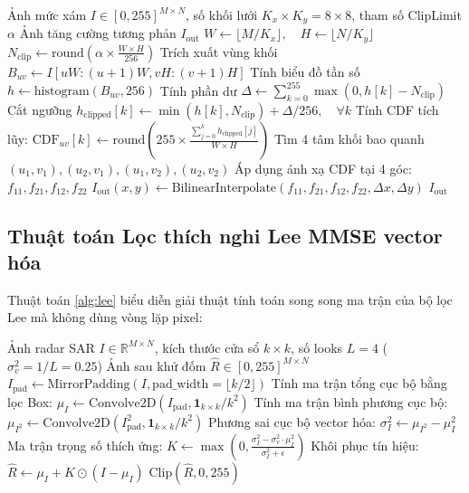 \begin{algorithm}[H]
\caption{Cân bằng Histogram thích nghi có ngưỡng (CLAHE)}
\label{alg:clahe}
\begin{algorithmic}[1]
\Require Ảnh mức xám $I \in [0, 255]^{M \times N}$, số khối lưới $K_x \times K_y = 8 \times 8$, tham số ClipLimit $\alpha$
\Ensure Ảnh tăng cường tương phản $I_{\text{out}}$
\State $W \gets \lfloor M / K_x \rfloor, \quad H \gets \lfloor N / K_y \rfloor$
\State $N_{\text{clip}} \gets \text{round}\left( \alpha \times \frac{W \times H}{256} \right)$
    \State Trích xuất vùng khối $B_{uv} \gets I[uW : (u+1)W, vH : (v+1)H]$
    \State Tính biểu đồ tần số $h \gets \text{histogram}(B_{uv}, 256)$
    \State Tính phần dư $\Delta \gets \sum_{k=0}^{255} \max(0, h[k] - N_{\text{clip}})$
    \State Cắt ngưỡng $h_{\text{clipped}}[k] \gets \min(h[k], N_{\text{clip}}) + \Delta / 256, \quad \forall k$
    \State Tính CDF tích lũy: $\text{CDF}_{uv}[k] \gets \text{round}\left( 255 \times \frac{\sum_{j=0}^k h_{\text{clipped}}[j]}{W \times H} \right)$
\EndFor
{}
    \State Tìm 4 tâm khối bao quanh $(u_1, v_1), (u_2, v_1), (u_1, v_2), (u_2, v_2)$
    \State Áp dụng ánh xạ CDF tại 4 góc: $f_{11}, f_{21}, f_{12}, f_{22}$
    \State $I_{\text{out}}(x, y) \gets \text{BilinearInterpolate}(f_{11}, f_{21}, f_{12}, f_{22}, \Delta x, \Delta y)$
\EndFor
\State \Return $I_{\text{out}}$
\end{algorithmic}
\end{algorithm}

\subsection{Thuật toán Lọc thích nghi Lee MMSE vector hóa}
Thuật toán \ref{alg:lee} biểu diễn giải thuật tính toán song song ma trận của bộ lọc Lee mà không dùng vòng lặp pixel:

\begin{algorithm}[H]
\caption{Bộ lọc đốm thích ứng Lee MMSE vector hóa}
\label{alg:lee}
\begin{algorithmic}[1]
\Require Ảnh radar SAR $I \in \mathbb{R}^{M \times N}$, kích thước cửa sổ $k \times k$, số looks $L=4$ ($\sigma_v^2 = 1/L = 0.25$)
\Ensure Ảnh sau khử đốm $\hat{R} \in [0, 255]^{M \times N}$
\State $I_{\text{pad}} \gets \text{MirrorPadding}(I, \text{pad\_width} = \lfloor k/2 \rfloor)$
\State Tính ma trận tổng cục bộ bằng lọc Box: $\mu_I \gets \text{Convolve2D}(I_{\text{pad}}, \mathbf{1}_{k \times k} / k^2)$
\State Tính ma trận bình phương cục bộ: $\mu_{I^2} \gets \text{Convolve2D}(I_{\text{pad}}^2, \mathbf{1}_{k \times k} / k^2)$
\State Phương sai cục bộ vector hóa: $\sigma_I^2 \gets \mu_{I^2} - \mu_I^2$
\State Ma trận trọng số thích ứng:
\State $K \gets \max\left(0, \frac{\sigma_I^2 - \sigma_v^2 \cdot \mu_I^2}{\sigma_I^2 + \epsilon}\right)$
\State Khôi phục tín hiệu: $\hat{R} \gets \mu_I + K \odot (I - \mu_I)$
\State \Return $\text{Clip}(\hat{R}, 0, 255)$
\end{algorithmic}
\end{algorithm}



